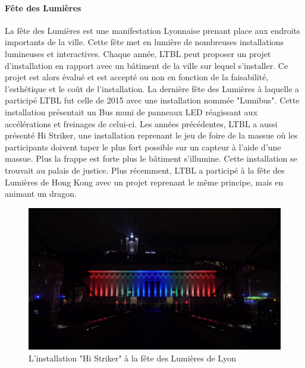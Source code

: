 \paragraph{Fête des Lumières} La fête des Lumières est une manifestation Lyonnaise prenant place aux endroits importants de la ville.
Cette fête met en lumière de nombreuses installations lumineuses et interactives.
Chaque année, LTBL peut proposer un projet d'installation en rapport avec un bâtiment de la ville sur lequel s'installer.
Ce projet est alors évalué et est accepté ou non en fonction de la faisabilité, l'esthétique et le coût de l'installation.
La dernière fête des Lumières à laquelle a participé LTBL fut celle de 2015 avec une installation nommée "Lumibus".
Cette installation présentait un Bus muni de panneaux LED réagissant aux accélérations et freinages de celui-ci.
Les années précédentes, LTBL a aussi présenté Hi Striker, une installation reprenant le jeu de foire de la massue où les participants doivent taper le plus fort possible sur un capteur à l'aide d'une massue.
Plus la frappe est forte plus le bâtiment s'illumine.
Cette installation se trouvait au palais de justice.
Plus récemment, LTBL a participé à la fête des Lumières de Hong Kong avec un projet reprenant le même principe, mais en animant un dragon.

\begin{figure}[h]
    \centering
    \includegraphics[scale=0.2]{img/hi-striker.png}
    \caption{L'installation "Hi Striker" à la fête des Lumières de Lyon}
\end{figure}


